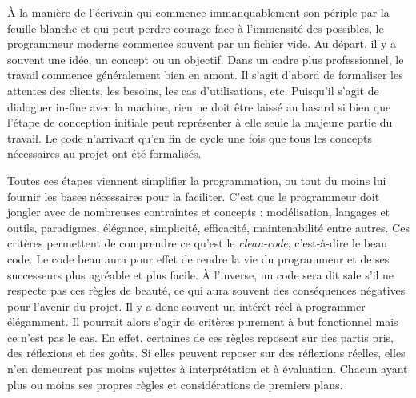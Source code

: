 \documentclass[12pt]{article} %
\begin{document}

À la manière de l'écrivain qui commence immanquablement son périple par la feuille blanche et qui peut perdre courage face à l'immensité des possibles, le programmeur moderne commence souvent par un fichier vide. Au départ, il y a souvent une idée, un concept ou un objectif. Dans un cadre plus professionnel, le travail commence généralement bien en amont. Il s'agit d'abord de formaliser les attentes des clients, les besoins, les cas d'utilisations, etc. Puisqu'il s'agit de dialoguer in-fine avec la machine, rien ne doit être laissé au hasard si bien que l'étape de conception initiale peut représenter à elle seule la majeure partie du travail. Le code n'arrivant qu'en fin de cycle une fois que tous les concepts nécessaires au projet ont été formalisés. 

Toutes ces étapes viennent simplifier la programmation, ou tout du moins lui fournir les bases nécessaires pour la faciliter. C'est que le programmeur doit jongler avec de nombreuses contraintes et concepts : modélisation, langages et outils, paradigmes, élégance, simplicité, efficacité, maintenabilité entre autres. Ces critères permettent de comprendre ce qu'est le \textit{clean-code}, c'est-à-dire le beau code. Le code beau aura pour effet de rendre la vie du programmeur et de ses successeurs plus agréable et plus facile. À l'inverse, un code sera dit sale s'il ne respecte pas ces règles de beauté, ce qui aura souvent des conséquences négatives pour l'avenir du projet. Il y a donc souvent un intérêt réel à programmer élégamment. Il pourrait alors s'agir de critères purement à but fonctionnel mais ce n'est pas le cas. En effet, certaines de ces règles reposent sur des partis pris, des réflexions et des goûts. Si elles peuvent reposer sur des réflexions réelles, elles n'en demeurent pas moins sujettes à interprétation et à évaluation. Chacun ayant plus ou moins ses propres règles et considérations de premiers plans. 
\end{document}
